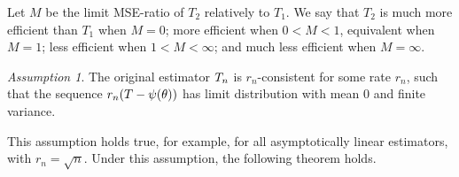 \documentclass[ejs, twoside]{imsart}
\theoremstyle{plain}
\newtheorem{proposition}[theorem]{Proposition}
\theoremstyle{remark}
\newtheorem{assumption}[theorem]{Assumption}
\newcommand{\fullstop}{\text{.}}
\newcommand{\real}{\mathbb{R}}
\numberwithin{equation}{section}
\numberwithin{table}{section}
\numberwithin{figure}{section}
\let\originalleft\left
\let\originalright\right
\renewcommand{\left}{\mathopen{}\mathclose\bgroup\originalleft}
\renewcommand{\right}{\aftergroup\egroup\originalright}
\begin{document}
	
	Let \(M\) be the limit MSE-ratio of \(T_2\) relatively to \(T_1\). We say that \(T_2\) is much more efficient than \(T_1\) when \(M = 0\); more efficient when \(0<M<1 \), equivalent when \(M = 1\); less efficient when \(1<M<\infty \); and much less efficient when \(M = \infty\).
	
	
	\begin{assumption} \label{assum:asymunbiased}
		The original estimator \(\estimreg\) is \(r_n\)-consistent for some rate \(r_n\), such that the sequence \(r_n\left(T-\psi\left(\theta \right)  \right) \) has limit distribution with mean \(0\) and finite variance.
		
	\end{assumption}
	This assumption holds true, for example, for all asymptotically linear estimators, with \(r_n = \sqrt{n}\). Under this assumption, the following theorem holds.
	
	


	
	
\end{document}
